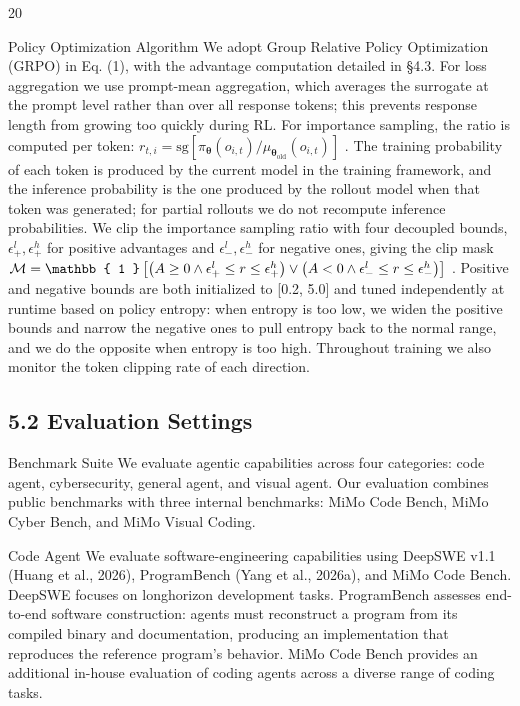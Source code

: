 \documentclass[
  10
]{article}
\begin{document}
20

Policy Optimization Algorithm We adopt Group Relative Policy
Optimization (GRPO) in Eq. (1), with the advantage computation detailed
in §4.3. For loss aggregation we use prompt-mean aggregation, which
averages the surrogate at the prompt level rather than over all response
tokens; this prevents response length from growing too quickly during
RL. For importance sampling, the ratio is computed per token:
\(r _ { t , i } = \mathrm { s g } [ \pi _ { \boldsymbol { \theta } } ( o _ { i , t } ) / \mu _ { \boldsymbol { \theta } _ { \mathrm { o l d } } } ( o _ { i , t } ) ]\)
. The training probability of each token is produced by the current
model in the training framework, and the inference probability is the
one produced by the rollout model when that token was generated; for
partial rollouts we do not recompute inference probabilities. We clip
the importance sampling ratio with four decoupled bounds,
\(\epsilon _ { + } ^ { l } , \epsilon _ { + } ^ { h }\) for positive
advantages and \(\epsilon _ { - } ^ { l } , \epsilon _ { - } ^ { h }\)
for negative ones, giving the clip mask
\({ \cal M } = \mathbb { 1 } \left[ \big ( A \ge 0 \land \epsilon _ { + } ^ { l } \le r \le \epsilon _ { + } ^ { h } \big ) \lor \big ( A < 0 \land \epsilon _ { - } ^ { l } \le r \le \epsilon _ { - } ^ { h } \big ) \right]\)
. Positive and negative bounds are both initialized to {[}0.2, 5.0{]}
and tuned independently at runtime based on policy entropy: when entropy
is too low, we widen the positive bounds and narrow the negative ones to
pull entropy back to the normal range, and we do the opposite when
entropy is too high. Throughout training we also monitor the token
clipping rate of each direction.

\subsection{5.2 Evaluation Settings}\label{evaluation-settings}

Benchmark Suite We evaluate agentic capabilities across four categories:
code agent, cybersecurity, general agent, and visual agent. Our
evaluation combines public benchmarks with three internal benchmarks:
MiMo Code Bench, MiMo Cyber Bench, and MiMo Visual Coding.

Code Agent We evaluate software-engineering capabilities using DeepSWE
v1.1 (Huang et al., 2026), ProgramBench (Yang et al., 2026a), and MiMo
Code Bench. DeepSWE focuses on longhorizon development tasks.
ProgramBench assesses end-to-end software construction: agents must
reconstruct a program from its compiled binary and documentation,
producing an implementation that reproduces the reference program's
behavior. MiMo Code Bench provides an additional in-house evaluation of
coding agents across a diverse range of coding tasks.
\end{document}
